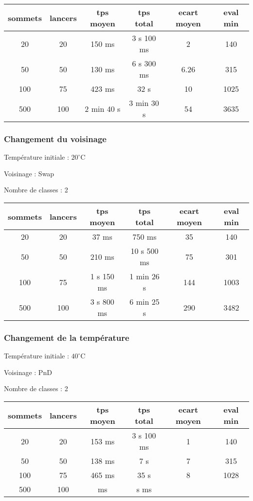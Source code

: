 \documentclass[12pt]{article}
\begin{document}
\begin{tabular}{|c|c|c|c|c|c|}
	\hline 
	sommets & lancers & tps moyen & tps total & ecart moyen & eval min\\
	\hline
	20 & 20 & 150 ms & 3 s 100 ms & 2 & 140 \\
	\hline
	 50  &  50  &   130  ms   &   6 s  300  ms   &   6.26  &   315  \\
	\hline
	 100  &  75  &   423  ms   &  32 s  &  10   &   1025  \\
	\hline
	 500  &  100  &  2 min 40 s  &  3 min 30  s &  54   &   3635  \\
	\hline
\end{tabular}
\bigskip

\subsubsection*{Changement du voisinage}

Température initiale : $20^\circ$C

Voisinage : Swap

Nombre de classes : 2
\bigskip

\begin{tabular}{|c|c|c|c|c|c|}
	\hline 
	sommets & lancers & tps moyen & tps total & ecart moyen & eval min\\
	\hline
	20 & 20 & 37 ms & 750 ms & 35 & 140 \\
	\hline
	 50  &  50  &   210  ms   &   10 s  500  ms   &  75   &   301  \\
	\hline
	 100  &  75  & 1 s 150  ms   &  1 min 26 s &  144   &   1003  \\
	\hline
	 500  &  100  & 3 s 800  ms  &  6 min 25  s &   290  &   3482  \\
	\hline
\end{tabular}
\bigskip

\subsubsection*{Changement de la température}

Température initiale : $40^\circ$C

Voisinage : PnD

Nombre de classes : 2

\bigskip
\begin{tabular}{|c|c|c|c|c|c|}
	\hline 
	sommets & lancers & tps moyen & tps total & ecart moyen & eval min\\
	\hline
	20 & 20 & 153 ms & 3 s 100 ms & 1 & 140 \\
	\hline
	 50  &  50  & 138 ms   &  7  s  &   7  & 315\\
	\hline
	 100  &  75  &   465  ms   &  35 s &   8  &  1028   \\
	\hline
	 500  &  100  &      ms  &    s    ms   &     &     \\
	\hline
\end{tabular}
\bigskip
\end{document}
